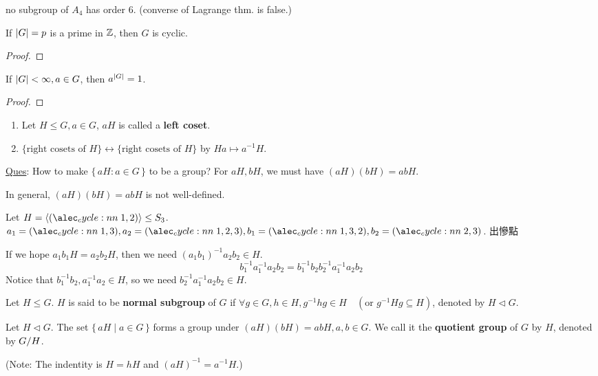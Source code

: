 \begin{exercise}
  no subgroup of $A_4$ has order $6$.
  (converse of Lagrange thm. is false.)
\end{exercise}

\begin{coro}
  If $\lvert G\rvert = p$ is a prime in $\mathbb{Z}$, then $G$ is cyclic.
  \begin{proof}
  \end{proof}
\end{coro}

\begin{coro}
  If $\lvert G\rvert < \infty, a \in G$, then $a^{\lvert G\rvert} = 1$.
  \begin{proof}
  \end{proof}
\end{coro}

\begin{remark} \mbox{}
  \begin{enumerate}
    \item Let $H \le G, a \in G$, $aH$ is called a {\bf left coset}.
    \item $\{ \text{right cosets of $H$} \} \leftrightarrow
      \{ \text{right cosets of $H$} \}$ by $Ha \mapsto a^{-1}H$.
  \end{enumerate}
\end{remark}

\underline{Ques}: How to make $\{\, aH : a \in G \,\}$ to be a group?
For $aH, bH$, we must have $(aH)(bH) = abH$.

In general, $(aH)(bH) = abH$ is not well-defined.

\begin{example}
  Let $H = \gen{\cycle{1,2}} \le S_3$. $a_1 = \cycle{1,3}, a_2 = \cycle{1,2,3},
b_1 = \cycle{1,3,2}, b_2 = \cycle{2,3}$. 出慘點
\end{example}

If we hope $a_1b_1H = a_2b_2H$, then we need $(a_1b_1)^{-1}a_2b_2 \in H$.
\[
  b_1^{-1}a_1^{-1}a_2b_2 = b_1^{-1}b_2b_2^{-1}a_1^{-1}a_2b_2
\]
Notice that $b_1^{-1}b_2, a_1^{-1}a_2 \in H$, so we need
$b_2^{-1}a_1^{-1}a_2b_2 \in H$.

\begin{definition}
  Let $H \le G$. $H$ is said to be {\bf normal subgroup} of $G$ if
  $\forall g \in G, h \in H, g^{-1}hg \in H \quad
  (\text{or~} g^{-1}Hg \subseteq H)$, denoted by $H \lhd G$.
\end{definition}

\begin{definition}
  Let $H \lhd G$. The set $\{\, aH \mid a \in G \,\}$ forms a group under
  $(aH)(bH) = abH, a,b \in G$. We call it the {\bf quotient group}
  of $G$ by $H$, denoted by ${G}/{H}$.

  (Note: The indentity is $H = hH$ and $(aH)^{-1} = a^{-1}H$.)
\end{definition}

